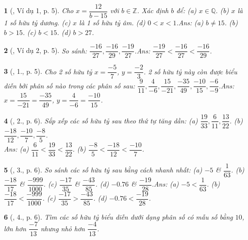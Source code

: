 \documentclass{article}
\newtheorem{baitoan}{}
\begin{document}
\begin{baitoan}[\cite{Tuyen_Toan_7}, Ví dụ 1, p. 5]
	Cho $x = \dfrac{12}{b - 15}$ với $b\in\mathbb{Z}$. Xác định $b$ để: (a) $x\in\mathbb{Q}$. (b) $x$ là 1 số hữu tỷ dương. (c) $x$ là 1 số hữu tỷ âm. (d) $0 < x < 1$.\hfill{\sf Ans: (a) $b\ne 15$. (b) $b > 15$. (c) $b < 15$. (d) $b > 27$.}
\end{baitoan}

\begin{baitoan}[\cite{Tuyen_Toan_7}, Ví dụ 2, p. 5]
	So sánh: $\dfrac{-16}{27},\dfrac{-16}{29},\dfrac{-19}{27}$.\hfill{\sf Ans: $\dfrac{-19}{27} < \dfrac{-16}{27} < \dfrac{-16}{29}$.}
\end{baitoan}

\begin{baitoan}[\cite{Tuyen_Toan_7}, 1., p. 5]
	Cho 2 số hữu tỷ $x = \dfrac{-5}{7}$, $y = \dfrac{-2}{3}$. 2 số hữu tỷ này còn được biểu diễn bởi phân số nào trong các phân số sau: $\dfrac{9}{11},\dfrac{4}{-6},\dfrac{15}{-21},\dfrac{-35}{49},\dfrac{-10}{15},\dfrac{-6}{-9}$.\hfill{\sf Ans: $x = \dfrac{15}{-21} = \dfrac{-35}{49}$, $y = \dfrac{4}{-6} = \dfrac{-10}{15}$.}
\end{baitoan}

\begin{baitoan}[\cite{Tuyen_Toan_7}, 2., p. 6]
	Sắp xếp các số hữu tỷ sau theo thứ tự tăng dần: (a) $\dfrac{19}{33},\dfrac{6}{11},\dfrac{13}{22}$. (b) $\dfrac{-18}{12},\dfrac{-10}{7},\dfrac{-8}{5}$.\\\mbox{}\hfill{\sf Ans: (a) $\dfrac{6}{11} < \dfrac{19}{33} < \dfrac{13}{22}$. (b) $\dfrac{-8}{5} < \dfrac{-18}{12} < \dfrac{-10}{7}$.}
\end{baitoan}

\begin{baitoan}[\cite{Tuyen_Toan_7}, 3., p. 6]
	So sánh các số hữu tỷ sau bằng cách nhanh nhất: (a) $-5$ \& $\dfrac{1}{63}$. (b) $\dfrac{-18}{17}$ \& $\dfrac{-999}{1000}$. (c) $\dfrac{-17}{35}$ \& $\dfrac{-43}{85}$. (d) $-0.76$ \& $\dfrac{-19}{28}$.\hfill{\sf Ans: (a) $-5 < \dfrac{1}{63}$. (b) $\dfrac{-18}{17} < \dfrac{-999}{1000}$. (c) $\dfrac{-17}{35} > \dfrac{-43}{85}$. (d) $-0.76 < \dfrac{-19}{28}$.}
\end{baitoan}

\begin{baitoan}[\cite{Tuyen_Toan_7}, 4., p. 6]
	Tìm các số hữu tỷ biểu diễn dưới dạng phân số có mẫu số bằng $10$, lớn hơn $\dfrac{-7}{13}$ nhưng nhỏ hơn $\dfrac{-4}{13}$.
\end{baitoan}
\end{document}
